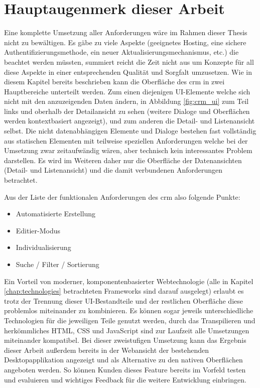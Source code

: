 \section{Hauptaugenmerk dieser Arbeit}
Eine komplette Umsetzung aller Anforderungen wäre im Rahmen dieser Thesis nicht zu bewältigen. Es gäbe zu viele Aspekte (geeignetes Hosting, eine sichere Authentifizierungsmethode, ein neuer Aktualisierungsmechanismus, etc.) die beachtet werden müssten, summiert reicht die Zeit nicht aus um Konzepte für all diese Aspekte in einer entsprechenden Qualität und Sorgfalt umzusetzen. 
Wie in diesem Kapitel bereits beschrieben kann die Oberfläche des \gls{crm} in zwei Hauptbereiche unterteilt werden. Zum einen diejenigen UI-Elemente welche sich nicht mit den anzuzeigenden Daten ändern, in Abbildung \ref{fig:crm_ui} zum Teil links und oberhalb der Detailansicht zu sehen (weitere Dialoge und Oberflächen werden kontextbasiert angezeigt), und zum anderen die Detail- und Listenansicht selbst. Die nicht datenabhängigen Elemente und Dialoge bestehen fast vollständig aus statischen Elementen mit teilweise speziellen Anforderungen welche bei der Umsetzung zwar zeitaufwändig wären, aber technisch kein interessantes Problem darstellen. Es wird im Weiteren daher nur die Oberfläche der Datenansichten (Detail- und Listenansicht) und die damit verbundenen Anforderungen betrachtet. 

Aus der Liste der funktionalen Anforderungen des \gls{crm} also folgende Punkte:
\begin{itemize}
    \item{Automatisierte Erstellung}
    \item{Editier-Modus}
    \item{Individualisierung}
    \item{Suche / Filter / Sortierung}
\end{itemize}


Ein Vorteil von moderner, komponentenbasierter Webtechnologie (alle in Kapitel \ref{chap:technologies} betrachteten Frameworks sind darauf ausgelegt) erlaubt es trotz der Trennung dieser UI-Bestandteile und der restlichen Oberfläche diese problemlos miteinander zu kombinieren. Es können sogar jeweils unterschiedliche Technologien für die jeweiligen Teile genutzt werden, durch das Transpilieren und herkömmliches HTML, CSS und JavaScript sind zur Laufzeit alle Umsetzungen miteinander kompatibel.
Bei dieser zweistufigen Umsetzung kann das Ergebnis dieser Arbeit außerdem bereits in der Webansicht der bestehenden Desktopapplikation angezeigt und als Alternative zu den nativen Oberflächen angeboten werden. So können Kunden dieses Feature bereits im Vorfeld testen und evaluieren und wichtiges Feedback für die weitere Entwicklung einbringen.
